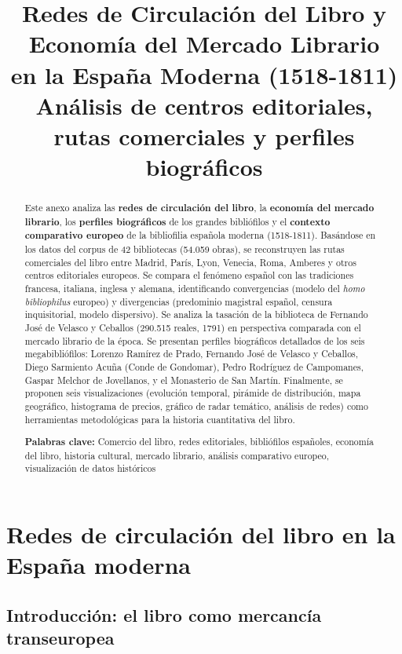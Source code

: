 \documentclass[11pt,a4paper]{article}
\title{
    {\Large\textbf{Redes de Circulación del Libro y Economía del Mercado Librario}}\\[0.5cm]
    {\large\textbf{en la España Moderna (1518-1811)}}\\[0.3cm]
    {\normalsize Análisis de centros editoriales, rutas comerciales y perfiles biográficos}
}
\author{}
\date{}
\begin{document}
\maketitle

\begin{abstract}
Este anexo analiza las \textbf{redes de circulación del libro}, la \textbf{economía del mercado librario}, los \textbf{perfiles biográficos} de los grandes bibliófilos y el \textbf{contexto comparativo europeo} de la bibliofilia española moderna (1518-1811). Basándose en los datos del corpus de 42 bibliotecas (54.059 obras), se reconstruyen las rutas comerciales del libro entre Madrid, París, Lyon, Venecia, Roma, Amberes y otros centros editoriales europeos. Se compara el fenómeno español con las tradiciones francesa, italiana, inglesa y alemana, identificando convergencias (modelo del \textit{homo bibliophilus} europeo) y divergencias (predominio magistral español, censura inquisitorial, modelo dispersivo). Se analiza la tasación de la biblioteca de Fernando José de Velasco y Ceballos (290.515 reales, 1791) en perspectiva comparada con el mercado librario de la época. Se presentan perfiles biográficos detallados de los seis megabibliófilos: Lorenzo Ramírez de Prado, Fernando José de Velasco y Ceballos, Diego Sarmiento Acuña (Conde de Gondomar), Pedro Rodríguez de Campomanes, Gaspar Melchor de Jovellanos, y el Monasterio de San Martín. Finalmente, se proponen seis visualizaciones (evolución temporal, pirámide de distribución, mapa geográfico, histograma de precios, gráfico de radar temático, análisis de redes) como herramientas metodológicas para la historia cuantitativa del libro.

\textbf{Palabras clave:} Comercio del libro, redes editoriales, bibliófilos españoles, economía del libro, historia cultural, mercado librario, análisis comparativo europeo, visualización de datos históricos
\end{abstract}

\tableofcontents
\newpage

\section{Redes de circulación del libro en la España moderna}

\subsection{Introducción: el libro como mercancía transeuropea}
\end{document}
